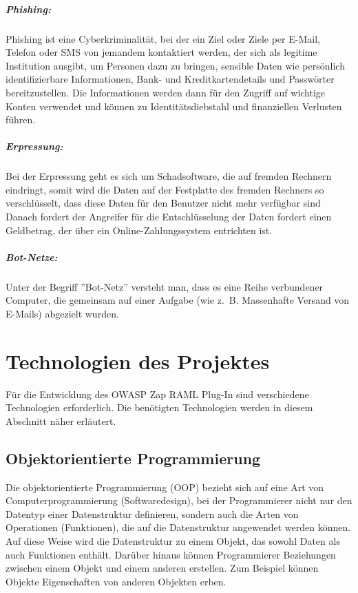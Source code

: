 \subparagraph{Phishing: }

Phishing ist eine Cyberkriminalität, bei der ein Ziel oder Ziele per E-Mail, Telefon oder SMS von jemandem kontaktiert werden, der sich als legitime Institution ausgibt, um Personen dazu zu bringen, sensible Daten wie persönlich identifizierbare Informationen, Bank- und Kreditkartendetails und Passwörter bereitzustellen. Die Informationen werden dann für den Zugriff auf wichtige Konten verwendet und können zu Identitätsdiebstahl und finanziellen Verlusten führen\cite{phishing17ph}.

\subparagraph{Erpressung: }

Bei der Erpressung geht es sich um Schadsoftware, die auf fremden Rechnern eindringt, somit wird die Daten auf der Festplatte des fremden Rechners so verschlüsselt, dass diese Daten für den Benutzer nicht mehr verfügbar sind Danach fordert der Angreifer für die Entschlüsselung der Daten fordert einen Geldbetrag, der über ein Online-Zahlungssystem entrichten ist\cite[48]{eckert2013sicherheit}.

\subparagraph{Bot-Netze: }

Unter der Begriff ''Bot-Netz'' versteht man, dass es eine Reihe verbundener Computer, die gemeinsam auf einer Aufgabe (wie z. B. Massenhafte Versand von E-Mails) abgezielt wurden\cite{botnetz17symantec}.

\section{Technologien des Projektes}

Für die Entwicklung des OWASP Zap RAML Plug-In sind verschiedene Technologien erforderlich. Die benötigten Technologien werden in diesem Abschnitt näher erläutert.

\subsection{Objektorientierte Programmierung}

Die objektorientierte Programmierung (OOP) bezieht sich auf eine Art von Computerprogrammierung (Softwaredesign), bei der Programmierer nicht nur den Datentyp einer Datenstruktur definieren, sondern auch die Arten von Operationen (Funktionen), die auf die Datenstruktur angewendet werden können. Auf diese Weise wird die Datenstruktur zu einem Objekt, das sowohl Daten als auch Funktionen enthält. Darüber hinaus können Programmierer Beziehungen zwischen einem Objekt und einem anderen erstellen. Zum Beispiel können Objekte Eigenschaften von anderen Objekten erben\cite{oop15beal}.

